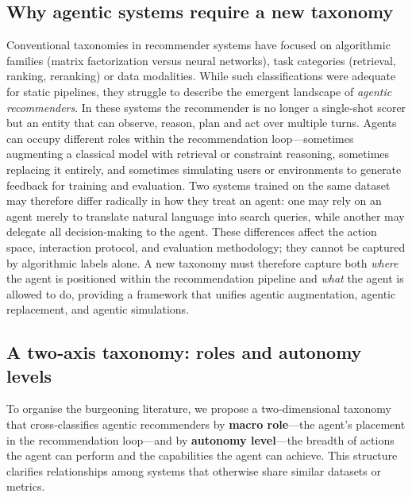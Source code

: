 \subsection{Why agentic systems require a new taxonomy}
\label{subsec:new-taxonomy-rationale}
{
Conventional taxonomies in recommender systems have focused on algorithmic families (matrix factorization versus neural networks), task categories (retrieval, ranking, reranking) or data modalities.  While such classifications were adequate for static pipelines, they struggle to describe the emergent landscape of \emph{agentic recommenders}.  In these systems the recommender is no longer a single‑shot scorer but an entity that can observe, reason, plan and act over multiple turns.  Agents can occupy different roles within the recommendation loop—sometimes augmenting a classical model with retrieval or constraint reasoning, sometimes replacing it entirely, and sometimes simulating users or environments to generate feedback for training and evaluation.  Two systems trained on the same dataset may therefore differ radically in how they treat an agent: one may rely on an agent merely to translate natural language into search queries, while another may delegate all decision‑making to the agent.  These differences affect the action space, interaction protocol, and evaluation methodology; they cannot be captured by algorithmic labels alone.  A new taxonomy must therefore capture both \emph{where} the agent is positioned within the recommendation pipeline and \emph{what} the agent is allowed to do, providing a framework that unifies agentic augmentation, agentic replacement, and agentic simulations.
}

\subsection{A two‑axis taxonomy: roles and autonomy levels}
\label{subsec:two-axis-taxonomy-rewrite}
{
To organise the burgeoning literature, we propose a two‑dimensional taxonomy that cross‑classifies agentic recommenders by \textbf{macro role}—the agent’s placement in the recommendation loop—and by \textbf{autonomy level}—the breadth of actions the agent can perform and the capabilities the agent can achieve. This structure clarifies relationships among systems that otherwise share similar datasets or metrics.
}


